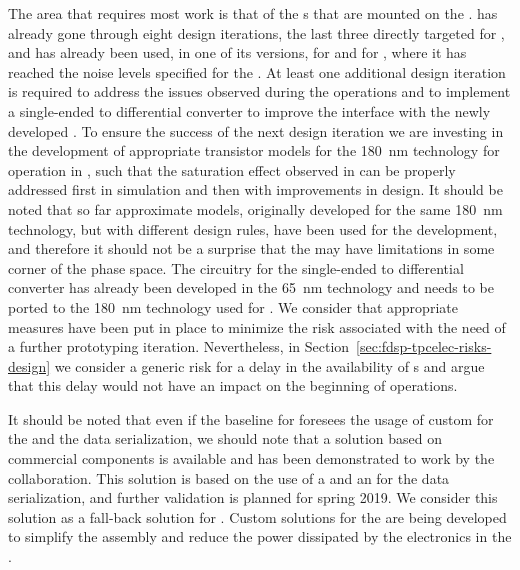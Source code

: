 The area that requires most work is that of the s that are mounted
on the .  has already gone through eight design
iterations, the last three directly targeted for , and has already been used, 
in one of its versions, for  and for , where it has reached the 
noise levels specified for the  . At least one additional design iteration is
required to address the issues observed during the  operations and
to implement a single-ended to differential converter to improve the interface
with the newly developed . To ensure the success of the next 
design iteration we are investing in the development of appropriate transistor
models for the \SI{180}{nm}  technology for operation in \lar, such that the saturation effect observed in 
 can be properly addressed first in simulation and then with improvements 
in design. It should be noted that so far approximate models, originally developed for 
the same \SI{180}{nm} technology, but with different design rules, have been used for 
the  development, and therefore it should not be a surprise
that the  may have limitations in some corner of the phase space.
The circuitry for the single-ended to differential converter has already been 
developed in the \SI{65}{nm} technology and needs to be ported to the \SI{180}{nm}
technology used for . We consider that appropriate measures have been
put in place to minimize the risk associated with the need of a further
prototyping iteration. Nevertheless, in Section~\ref{sec:fdsp-tpcelec-risks-design}
we consider a generic risk for a delay in the availability of s and
argue that this delay would not have an impact on the beginning of  operations.

It should be noted that even if the baseline for  foresees the usage
of custom  for the  and the data serialization, we should
note that a solution based on commercial components is available and has been 
demonstrated to work by the  collaboration. This solution is based on
the use of a   and an  for the data serialization,
and further validation is planned for spring 2019. We consider this solution as
a fall-back solution for . Custom solutions for the  are 
being developed to simplify the  assembly and reduce the power dissipated by the
electronics in the \lar.

